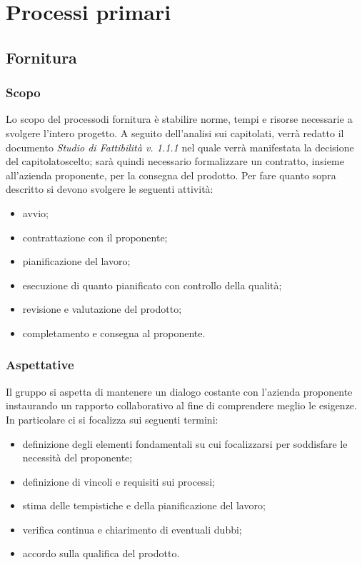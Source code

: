 \section{Processi primari}
\subsection{Fornitura}
\subsubsection{Scopo}
Lo scopo del processo\glosp di fornitura è stabilire norme, tempi e risorse necessarie a svolgere l'intero progetto\glo.
A seguito dell'analisi sui capitolati\glo, verrà redatto il documento \textit{Studio di Fattibilità v. 1.1.1} nel quale verrà manifestata la decisione del capitolato\glosp scelto; sarà quindi necessario formalizzare un contratto, insieme all'azienda proponente, per la consegna del prodotto\glo. 
Per fare quanto sopra descritto si devono svolgere le seguenti attività:
\begin{itemize}
	\item avvio;
	\item contrattazione con il proponente;
	\item pianificazione del lavoro;
	\item esecuzione di quanto pianificato con controllo della qualità;
	\item revisione e valutazione del prodotto\glo;
	\item completamento e consegna al proponente.
\end{itemize}
\subsubsection{Aspettative}
Il gruppo si aspetta di mantenere un dialogo costante con l'azienda proponente instaurando un rapporto collaborativo al fine di comprendere meglio le esigenze. In particolare ci si focalizza sui seguenti termini:
\begin{itemize}
	\item definizione degli elementi fondamentali su cui focalizzarsi per soddisfare le necessità del proponente;
	\item definizione di vincoli e requisiti sui processi\glo;
	\item stima delle tempistiche e della pianificazione del lavoro;
	\item verifica continua e chiarimento di eventuali dubbi;
	\item accordo sulla qualifica del prodotto\glo.
\end{itemize} 
